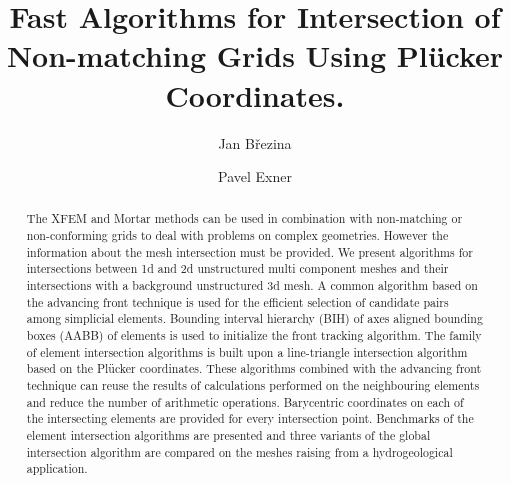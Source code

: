 \documentclass{elsarticle}
\newcommand{\plucker}{Pl\"{u}cker }
\begin{document}
\begin{frontmatter}



\title{Fast Algorithms for Intersection of Non-matching Grids Using \plucker Coordinates.}



\author[adr]{Jan B{\v r}ezina}

\author[adr]{Pavel Exner}

\address[adr]{Technical University of Liberec, Studentsk{\' a} 1402/2, 461 17 Liberec 1, Czech Republic}


\begin{abstract}
The XFEM and Mortar methods can be used in combination with non-matching or non-conforming grids 
to deal with problems on complex geometries. However the information about the mesh intersection must be provided.
We present algorithms for intersections between 1d and 2d unstructured multi component meshes 
and their intersections with a background unstructured 3d mesh. A common algorithm 
based on the advancing front technique is used for the efficient selection of candidate pairs among 
simplicial elements. Bounding interval hierarchy (BIH) of axes aligned bounding boxes (AABB) of elements
is used to initialize the front tracking algorithm. The family of element intersection algorithms
is built upon a line-triangle intersection algorithm based on the \plucker
coordinates. These algorithms combined with the advancing front technique can reuse the results of calculations 
performed on the neighbouring elements and reduce the number of arithmetic operations. Barycentric coordinates
on each of the intersecting elements are provided for every intersection point. Benchmarks 
of the element intersection algorithms are presented and three variants of the global intersection 
algorithm are compared on the meshes raising from a hydrogeological application.
\end{abstract}


\end{frontmatter}
\end{document}
